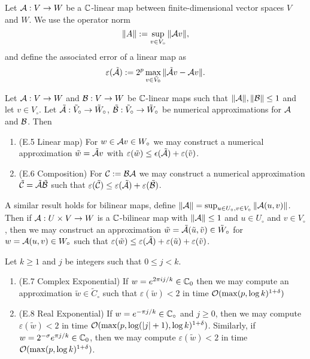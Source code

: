 Let $\mathcal A: V \to W$ be a ${\mathbb C}$-linear map between finite-dimensional vector spaces $V$ and $W$. We use the operator norm
\[
    \|A\| := \sup_{v \in V_\circ} \|\mathcal Av\|,
\]
and define the associated error of a linear map as
\[
    \varepsilon(\tilde{\mathcal A}) := 2^p \max_{v \in \tilde{V}_0} \|\tilde{\mathcal A}v - \mathcal Av\|.
\]
\begin{proposition}
    Let $\mathcal A: V \to W$ and $\mathcal B: V \to W$ be ${\mathbb C}$-linear maps such that $\|\mathcal A\|, \|\mathcal B\| \le 1$ and let $v \in V_\circ$. Let $\tilde{\mathcal A}: \tilde{V}_\circ \to \tilde{W}_\circ$, $\tilde{\mathcal B}: \tilde{V}_\circ \to \tilde{W}_\circ$ be numerical approximations for $\mathcal A$ and $\mathcal B$. Then

    \begin{enumerate}
        \item (E.5 Linear map) For $w \in \mathcal Av \in W_\circ$ we may construct a numerical approximation $\tilde{w} = \tilde{\mathcal A}v$ with $\varepsilon(\tilde{w}) \le \epsilon(\tilde{\mathcal A}) + \varepsilon(\tilde{v})$.
        \item (E.6 Composition) For $\mathcal C := \mathcal B\mathcal A$ we may construct a numerical approximation $\tilde{\mathcal C} = \tilde{\mathcal A}\tilde{\mathcal B}$ such that $\varepsilon(\tilde{\mathcal C}) \le \varepsilon(\tilde{\mathcal A}) + \varepsilon(\tilde{\mathcal B})$.
    \end{enumerate}
\end{proposition}

\begin{lemma}\label{lem:err-bilinear-map}
    A similar result holds for bilinear maps, define $\|\mathcal A\| = \sup_{u \in U_\circ, v \in V_\circ} \|\mathcal A(u, v)\|$.
    Then if $\mathcal A: U \times V \to W$ is a ${\mathbb C}$-bilinear map with $\|\mathcal A\| \le 1$ and $u \in U_\circ$ and $v \in V_\circ$, then we may construct an approximation $\tilde{w} = \tilde{\mathcal A}(\tilde{u}, \tilde{v}) \in \tilde{W}_\circ$ for $w = \mathcal A(u, v) \in W_\circ$ such that $\varepsilon(\tilde{w}) \le \varepsilon(\tilde{\mathcal A}) + \varepsilon(\tilde{u}) + \varepsilon(\tilde{v})$.
\end{lemma}


\begin{lemma}
    Let $k \ge 1$ and $j$ be integers such that $0 \le j < k$.
    \begin{enumerate}
        \item (E.7 Complex Exponential) If $w = e^{2\pi i j / k} \in {\mathbb C}_0$ then we may compute an approximation $\tilde{w} \in \tilde{C}_\circ$ such that $\varepsilon(\tilde{w}) < 2$ in time $\mathcal O(\max(p, \log k)^{1 + \delta})$
        \item (E.8 Real Exponential) If $w = e^{-\pi j / k} \in {\mathbb C}_\circ$ and $j \ge 0$, then we may compute $\varepsilon(\tilde{w}) < 2$ in time $\mathcal O(\max(p, \log (|j| + 1), \log k)^{1 + \delta})$. Similarly, if $w = 2^{- \sigma} e^{\pi j / k} \in {\mathbb C}_0$, then we may compute $\varepsilon(\tilde{w}) < 2$ in time $\mathcal O(\max(p, \log k)^{1 + \delta})$.
    \end{enumerate}
\end{lemma}



